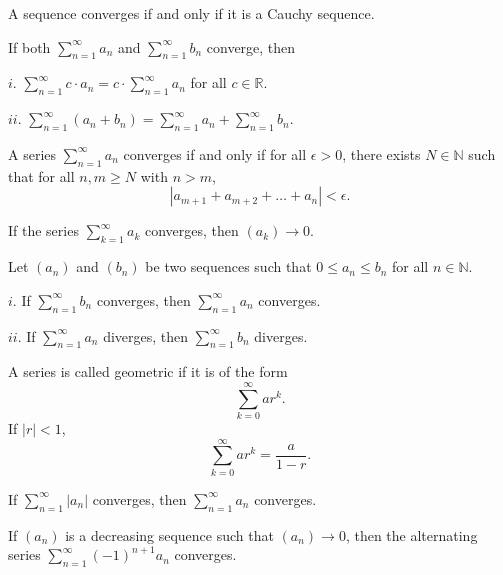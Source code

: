 \documentclass{article}
\begin{document}
    A sequence converges if and only if it is a Cauchy sequence.

\medskip
{}

    If both $\sum\limits_{n=1}^\infty a_n$ and $\sum\limits_{n=1}^\infty b_n$ converge, then
    
    $i$. $\sum\limits_{n=1}^\infty c \cdot a_n = c \cdot \sum\limits_{n=1}^\infty a_n$ for all $c \in \mathbb R$.
    
    $ii$. $\sum\limits_{n=1}^\infty (a_n + b_n) = \sum\limits_{n=1}^\infty a_n + \sum\limits_{n=1}^\infty b_n$.

\medskip
{}

    A series $\sum\limits_{n=1}^\infty a_n$ converges if and only if for all $\epsilon > 0$, there exists $N \in \mathbb N$ such that for all $n,m \geq N$ with $n > m$, $$|a_{m+1}+a_{m+2} + \hdots + a_n| < \epsilon.$$

\mewdskip
{}

    If the series $\sum\limits_{k=1}^\infty a_k$ converges, then $(a_k) \to 0$.

\medskip
{}

    Let $(a_n)$ and $(b_n)$ be two sequences such that $0 \leq a_n \leq b_n$ for all $n \in \mathbb N$.
    
    $i$. If $\sum\limits_{n=1}^\infty b_n$ converges, then $\sum\limits_{n=1}^\infty a_n$ converges.
    
    $ii$. If $\sum\limits_{n=1}^\infty a_n$ diverges, then $\sum\limits_{n=1}^\infty b_n$ diverges.

\medskip
{}

    A series is called geometric if it is of the form $$\sum_{k=0}^\infty ar^k.$$ If $|r| < 1$, $$\sum_{k=0}^\infty ar^k = \frac a{1-r}.$$

\medskip
{}

    If $\sum\limits_{n=1}^\infty |a_n|$ converges, then $\sum\limits_{n=1}^\infty a_n$ converges.

\medskip
{}

    If $(a_n)$ is a decreasing sequence such that $(a_n) \to 0$, then the alternating series $\sum\limits_{n=1}^\infty(-1)^{n+1}a_n$ converges.

\medskip
{}
\end{document}
